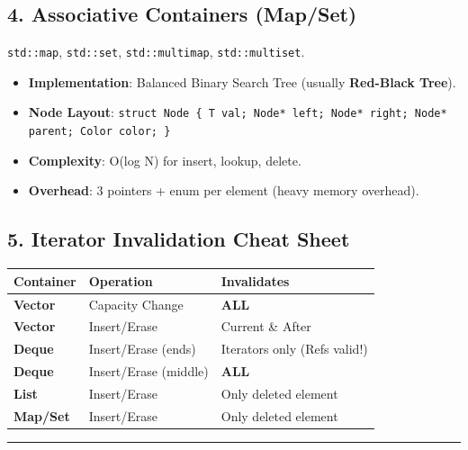 \hypertarget{associative-containers-mapset}{%
\subsection{4. Associative Containers
(Map/Set)}\label{associative-containers-mapset}}

\passthrough{\lstinline!std::map!}, \passthrough{\lstinline!std::set!},
\passthrough{\lstinline!std::multimap!},
\passthrough{\lstinline!std::multiset!}.

\begin{itemize}
\tightlist
\item
  \textbf{Implementation}: Balanced Binary Search Tree (usually
  \textbf{Red-Black Tree}).
\item
  \textbf{Node Layout}:
  \passthrough{\lstinline!struct Node \{ T val; Node* left; Node* right; Node* parent; Color color; \}!}
\item
  \textbf{Complexity}: O(log N) for insert, lookup, delete.
\item
  \textbf{Overhead}: 3 pointers + enum per element (heavy memory
  overhead).
\end{itemize}

\hypertarget{iterator-invalidation-cheat-sheet}{%
\subsection{5. Iterator Invalidation Cheat
Sheet}\label{iterator-invalidation-cheat-sheet}}

\begin{longtable}[]{@{}lll@{}}
\toprule
Container & Operation & Invalidates \\
\midrule
\endhead
\textbf{Vector} & Capacity Change & \textbf{ALL} \\
\textbf{Vector} & Insert/Erase & Current \& After \\
\textbf{Deque} & Insert/Erase (ends) & Iterators only (Refs valid!) \\
\textbf{Deque} & Insert/Erase (middle) & \textbf{ALL} \\
\textbf{List} & Insert/Erase & Only deleted element \\
\textbf{Map/Set} & Insert/Erase & Only deleted element \\
\bottomrule
\end{longtable}

\begin{center}\rule{0.5\linewidth}{0.5pt}\end{center}
